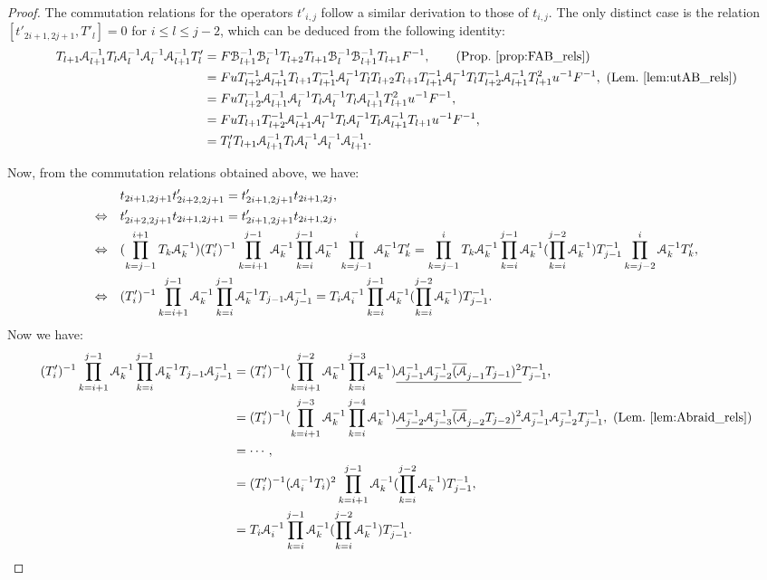 \documentclass{amsart}
\begin{document}
\begin{proof}
The commutation relations for the operators $t'_{i,j}$ follow a similar derivation to those of $t_{i,j}$. The only distinct case is the relation $[t'_{2i+1,2j+1},T'_l]=0$ for $i\leq l\leq j-2$, which can be deduced from the following identity:
\[
\begin{aligned}
 T_{l+1}\AA^{-1}_{l+1}T_{l}\AA^{-1}_{l}\AA^{-1}_l\AA^{-1}_{l+1}T'_l &=F\BB^{-1}_{l+1}\BB^{-1}_{l}T_{l+2}T_{l+1}\BB^{-1}_l\BB^{-1}_{l+1}T_{l+1}F^{-1},\qquad (\text{Prop.~\ref{prop:FAB_rels}})\\
 &=FuT^{-1}_{l+2}\AA^{-1}_{l+1}T_{l+1}T^{-1}_{l+1}\AA^{-1}_lT_lT_{l+2}T_{l+1}T^{-1}_{l+1}\AA^{-1}_lT_lT^{-1}_{l+2}\AA^{-1}_{l+1}T^2_{l+1}u^{-1}F^{-1},\  (\text{Lem.~\ref{lem:utAB_rels}})\\
 &=FuT^{-1}_{l+2}\AA^{-1}_{l+1}\AA^{-1}_lT_l\AA^{-1}_lT_l\AA^{-1}_{l+1}T^2_{l+1}u^{-1}F^{-1},\\
 &=FuT_{l+1}T^{-1}_{l+2}\AA^{-1}_{l+1}\AA^{-1}_lT_l\AA^{-1}_lT_l\AA^{-1}_{l+1}T_{l+1}u^{-1}F^{-1},\\
 &=T'_lT_{l+1}\AA^{-1}_{l+1}T_{l}\AA^{-1}_{l}\AA^{-1}_l\AA^{-1}_{l+1}.
\end{aligned}
\]

Now, from the commutation relations obtained above, we have:
\begin{align*}
&t_{2i+1,2j+1}t'_{2i+2,2j+1}=t'_{2i+1,2j+1}t_{2i+1,2j},\\
\Leftrightarrow\quad& t'_{2i+2,2j+1}t_{2i+1,2j+1}=t'_{2i+1,2j+1}t_{2i+1,2j},\\
\Leftrightarrow\quad& (\prod^{i+1}_{k=j-1}T_k\AA^{-1}_k)(T'_{i})^{-1}\prod^{j-1}_{k=i+1}\AA^{-1}_k\prod^{j-1}_{k=i}\AA^{-1}_k\prod^{i}_{k=j-1}\AA^{-1}_kT'_k=\prod^{i}_{k=j-1}T_k\AA^{-1}_k\prod^{j-1}_{k=i}\AA^{-1}_k(\prod^{j-2}_{k=i}\AA^{-1}_k)T^{-1}_{j-1}\prod^{i}_{k=j-2}\AA^{-1}_kT'_k,\\
\Leftrightarrow\quad& (T'_{i})^{-1}\prod^{j-1}_{k=i+1}\AA^{-1}_k\prod^{j-1}_{k=i}\AA^{-1}_kT_{j-1}\AA^{-1}_{j-1}=T_i\AA^{-1}_i\prod^{j-1}_{k=i}\AA^{-1}_k(\prod^{j-2}_{k=i}\AA^{-1}_k)T^{-1}_{j-1}.
\end{align*}
Now we have: 
\begin{align*}
(T'_{i})^{-1}\prod^{j-1}_{k=i+1}\AA^{-1}_k\prod^{j-1}_{k=i}\AA^{-1}_kT_{j-1}\AA^{-1}_{j-1}&=(T'_{i})^{-1}(\prod^{j-2}_{k=i+1}\AA^{-1}_k\prod^{j-3}_{k=i}\AA^{-1}_k)\underline{\AA^{-1}_{j-1}\AA^{-1}_{j-2}\overline{(\AA}_{j-1}T_{j-1})^2}T^{-1}_{j-1},\\
&= (T'_{i})^{-1}(\prod^{j-3}_{k=i+1}\AA^{-1}_k\prod^{j-4}_{k=i}\AA^{-1}_k)\underline{\AA^{-1}_{j-2}\AA^{-1}_{j-3}\overline{(\AA}_{j-2}T_{j-2})^2}\AA^{-1}_{j-1}\AA^{-1}_{j-2}T^{-1}_{j-1},\  (\text{Lem.~\ref{lem:Abraid_rels}})\\
&= \cdots,\\
&= (T'_{i})^{-1}(\AA^{-1}_iT_i)^2\prod^{j-1}_{k=i+1}\AA^{-1}_k(\prod^{j-2}_{k=i}\AA^{-1}_k)T^{-1}_{j-1},\\
&=T_i\AA^{-1}_i\prod^{j-1}_{k=i}\AA^{-1}_k(\prod^{j-2}_{k=i}\AA^{-1}_k)T^{-1}_{j-1}.
\end{align*}


\end{proof}
\end{document}
